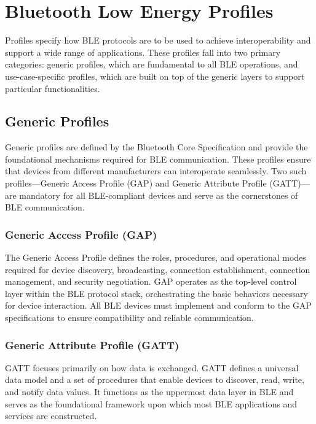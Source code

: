 \section{Bluetooth Low Energy Profiles}

Profiles specify how BLE protocols are to be used to achieve interoperability and support a wide range of applications. These profiles fall into two primary categories: generic profiles, which are fundamental to all BLE operations, and use-case-specific profiles, which are built on top of the generic layers to support particular functionalities.

\subsection{Generic Profiles}

Generic profiles are defined by the Bluetooth Core Specification and provide the foundational mechanisms required for BLE communication. These profiles ensure that devices from different manufacturers can interoperate seamlessly. Two such profiles—Generic Access Profile (GAP) and Generic Attribute Profile (GATT)—are mandatory for all BLE-compliant devices and serve as the cornerstones of BLE communication.

\subsubsection{Generic Access Profile (GAP)}

The Generic Access Profile defines the roles, procedures, and operational modes required for device discovery, broadcasting, connection establishment, connection management, and security negotiation. GAP operates as the top-level control layer within the BLE protocol stack, orchestrating the basic behaviors necessary for device interaction. All BLE devices must implement and conform to the GAP specifications to ensure compatibility and reliable communication.

\subsubsection{Generic Attribute Profile (GATT)}

GATT focuses primarily on how data is exchanged. GATT defines a universal data model and a set of procedures that enable devices to discover, read, write, and notify data values. It functions as the uppermost data layer in BLE and serves as the foundational framework upon which most BLE applications and services are constructed.

